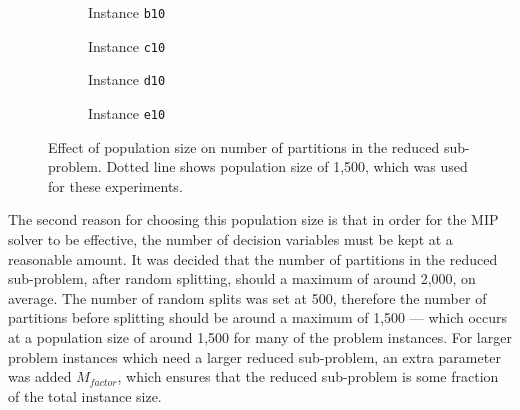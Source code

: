 \documentclass[journal]{IEEEtran}
\begin{document}
\begin{center}
\begin{figure}[h]
    \centering
    \begin{subfigure}[t]{0.23\textwidth}
    \centering
    \caption{Instance \texttt{b10}}
    \label{fig:stpg_pop.1}
    \end{subfigure}
    \quad
    \begin{subfigure}[t]{0.23\textwidth}
    \centering
    \caption{Instance \texttt{c10}}
    \label{fig:stpg_pop.2}
    \end{subfigure}
    \quad
    \begin{subfigure}[t]{0.23\textwidth}
    \centering
    \caption{Instance \texttt{d10}}
    \label{fig:stpg_pop.3}
    \end{subfigure}
    \quad 
    \begin{subfigure}[t]{0.23\textwidth}
    \centering
    \caption{Instance \texttt{e10}}
    \label{fig:stpg_pop.4}
    \end{subfigure}
    \caption[Effect of population size on number of partitions in the reduced sub-problem]{Effect of population size on number of partitions in the reduced sub-problem. Dotted line shows population size of 1,500, which was used for these experiments.} 
    \label{fig:stpg_pop_plots}
\end{figure}
\end{center}
%
The second reason for choosing this population size is that in order for the MIP solver to be effective, the number of decision variables must be kept at a reasonable amount. It was decided that the number of partitions in the reduced sub-problem, after random splitting, should a maximum of around 2,000, on average. The number of random splits was set at 500, therefore the number of partitions before splitting should be around a maximum of 1,500 --- which occurs at a population size of around 1,500 for many of the problem instances. For larger problem instances which need a larger reduced sub-problem, an extra parameter was added \(M_{factor}\), which ensures that the reduced sub-problem is some fraction of the total instance size.
\end{document}
